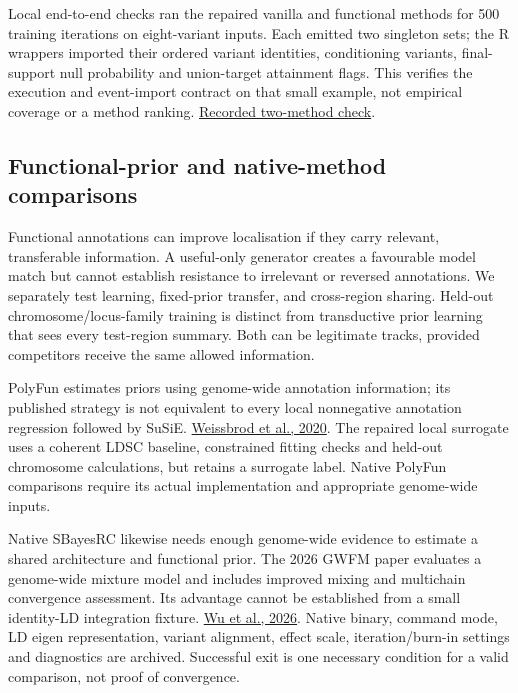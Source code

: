 \documentclass[
  british,
  10pt,
]{article}
\begin{document}
Local end-to-end checks ran the repaired vanilla and functional methods
for 500 training iterations on eight-variant inputs. Each emitted two
singleton sets; the R wrappers imported their ordered variant
identities, conditioning variants, final-support null probability and
union-target attainment flags. This verifies the execution and
event-import contract on that small example, not empirical coverage or a
method ranking.
\href{../docs/validation-artifacts/campaign-hardening-20261010/beatrice-events-proof.json}{Recorded
two-method check}.

\subsection{Functional-prior and native-method
comparisons}\label{functional-prior-and-native-method-comparisons}

Functional annotations can improve localisation if they carry relevant,
transferable information. A useful-only generator creates a favourable
model match but cannot establish resistance to irrelevant or reversed
annotations. We separately test learning, fixed-prior transfer, and
cross-region sharing. Held-out chromosome/locus-family training is
distinct from transductive prior learning that sees every test-region
summary. Both can be legitimate tracks, provided competitors receive the
same allowed information.

PolyFun estimates priors using genome-wide annotation information; its
published strategy is not equivalent to every local nonnegative
annotation regression followed by SuSiE.
\href{https://doi.org/10.1038/s41588-020-00735-5}{Weissbrod et al.,
2020}. The repaired local surrogate uses a coherent LDSC baseline,
constrained fitting checks and held-out chromosome calculations, but
retains a surrogate label. Native PolyFun comparisons require its actual
implementation and appropriate genome-wide inputs.

Native SBayesRC likewise needs enough genome-wide evidence to estimate a
shared architecture and functional prior. The 2026 GWFM paper evaluates
a genome-wide mixture model and includes improved mixing and multichain
convergence assessment. Its advantage cannot be established from a small
identity-LD integration fixture.
\href{https://doi.org/10.1038/s41588-026-02549-3}{Wu et al., 2026}.
Native binary, command mode, LD eigen representation, variant alignment,
effect scale, iteration/burn-in settings and diagnostics are archived.
Successful exit is one necessary condition for a valid comparison, not
proof of convergence.
\end{document}
